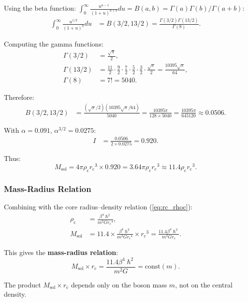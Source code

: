 \documentclass[11pt,a4paper]{article}
\newcommand{\hbar}{\ensuremath{\hslash}}
\newcommand{\Msol}{\ensuremath{M_{\mathrm{sol}}}}
\newcommand{\rc}{\ensuremath{r_{\mathrm{c}}}}
\newcommand{\rhoc}{\ensuremath{\rho_{\mathrm{c}}}}
\theoremstyle{definition}
\theoremstyle{remark}
\begin{document}
Using the beta function: $\int_0^\infty \frac{u^{a-1}}{(1+u)^{a+b}} du = B(a,b) = \Gamma(a)\Gamma(b)/\Gamma(a+b)$:
\begin{align}
\int_0^\infty \frac{u^{1/2}}{(1+u)^8} du &= B(3/2, 13/2) = \frac{\Gamma(3/2)\Gamma(13/2)}{\Gamma(8)}.
\end{align}

Computing the gamma functions:
\begin{align}
\Gamma(3/2) &= \frac{\sqrt{\pi}}{2}, \\
\Gamma(13/2) &= \frac{11}{2} \cdot \frac{9}{2} \cdot \frac{7}{2} \cdot \frac{5}{2} \cdot \frac{3}{2} \cdot \frac{\sqrt{\pi}}{2} = \frac{10395\sqrt{\pi}}{64}, \\
\Gamma(8) &= 7! = 5040.
\end{align}

Therefore:
\begin{align}
B(3/2, 13/2) &= \frac{(\sqrt{\pi}/2)(10395\sqrt{\pi}/64)}{5040} = \frac{10395 \pi}{128 \times 5040} = \frac{10395\pi}{645120} \approx 0.0506.
\end{align}

With $\alpha = 0.091$, $\alpha^{3/2} = 0.0275$:
\begin{align}
I &= \frac{0.0506}{2 \times 0.0275} = 0.920.
\end{align}

Thus:
\begin{equation}
\Msol = 4\pi \rhoc \rc^3 \times 0.920 = 3.64 \pi \rhoc \rc^3 \approx 11.4 \rhoc \rc^3.
\end{equation}

\subsubsection{Mass-Radius Relation}

Combining with the core radius--density relation (\ref{eq:rc_rhoc}):
\begin{align}
\rhoc &= \frac{\beta^4 \hbar^2}{m^2 G \rc^4}, \\
\Msol &= 11.4 \times \frac{\beta^4 \hbar^2}{m^2 G \rc^4} \times \rc^3 = \frac{11.4 \beta^4 \hbar^2}{m^2 G \rc}.
\end{align}

This gives the \textbf{mass-radius relation}:
\begin{equation}
\label{eq:mass_radius}
\boxed{\Msol \times \rc = \frac{11.4 \beta^4 \hbar^2}{m^2 G} = \text{const}(m).}
\end{equation}

The product $\Msol \times \rc$ depends only on the boson mass $m$, not on the central density.
\end{document}
